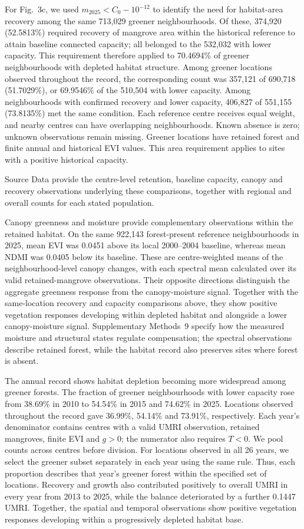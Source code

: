 For Fig.~3c, we used $m_{2025}<C_0-10^{-12}$ to identify the need for habitat-area recovery among the same 713,029 greener neighbourhoods. Of these, 374,920 (52.5813\%) required recovery of mangrove area within the historical reference to attain baseline connected capacity; all belonged to the 532,032 with lower capacity. This requirement therefore applied to 70.4694\% of greener neighbourhoods with depleted habitat structure. Among greener locations observed throughout the record, the corresponding count was 357,121 of 690,718 (51.7029\%), or 69.9546\% of the 510,504 with lower capacity. Among neighbourhoods with confirmed recovery and lower capacity, 406,827 of 551,155 (73.8135\%) met the same condition.  Each reference centre receives equal weight, and nearby centres can have overlapping neighbourhoods. Known absence is zero; unknown observations remain missing. Greener locations have retained forest and finite annual and historical EVI values. This area requirement applies to sites with a positive historical capacity.

Source Data provide the centre-level retention, baseline capacity, canopy and recovery observations underlying these comparisons, together with regional and overall counts for each stated population.

Canopy greenness and moisture provide complementary observations within the retained habitat. On the same 922,143 forest-present reference neighbourhoods in 2025, mean EVI was 0.0451 above its local 2000--2004 baseline, whereas mean NDMI was 0.0405 below its baseline. These are centre-weighted means of the neighbourhood-level canopy changes, with each spectral mean calculated over its valid retained-mangrove observations. Their opposite directions distinguish the aggregate greenness response from the canopy-moisture signal. Together with the same-location recovery and capacity comparisons above, they show positive vegetation responses developing within depleted habitat and alongside a lower canopy-moisture signal. Supplementary Methods~9 specify how the measured moisture and structural states regulate compensation; the spectral observations describe retained forest, while the habitat record also preserves sites where forest is absent.

The annual record shows habitat depletion becoming more widespread among greener forests. The fraction of greener neighbourhoods with lower capacity rose from 38.69\% in 2010 to 54.54\% in 2015 and 74.62\% in 2025. Locations observed throughout the record gave 36.99\%, 54.14\% and 73.91\%, respectively. Each year's denominator contains centres with a valid UMRI observation, retained mangroves, finite EVI and $g>0$; the numerator also requires $T<0$. We pool counts across centres before division. For locations observed in all 26 years, we select the greener subset separately in each year using the same rule. Thus, each proportion describes that year's greener forest within the specified set of locations. Recovery and growth also contributed positively to overall UMRI in every year from 2013 to 2025, while the balance deteriorated by a further 0.1447 UMRI. Together, the spatial and temporal observations show positive vegetation responses developing within a progressively depleted habitat base.

